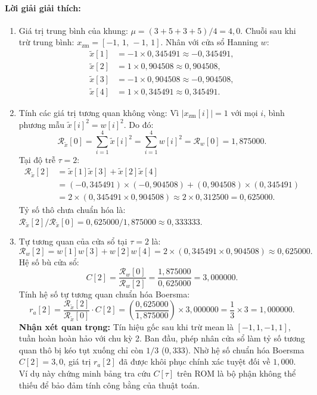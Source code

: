 \paragraph{Lời giải giải thích:}
\begin{enumerate}[label=\alph*)]
    \item Giá trị trung bình của khung: $\mu = (3 + 5 + 3 + 5) / 4 = 4{,}0$.
    Chuỗi sau khi trừ trung bình: $x_{\mathrm{zm}} = [-1,\, 1,\, -1,\, 1]$.
    Nhân với cửa sổ Hanning $w$:
    \begin{align*}
    \tilde{x}[1] &= -1 \times 0{,}345491 \approx -0{,}345491,\\[4pt]
    \tilde{x}[2] &= 1 \times 0{,}904508 \approx 0{,}904508,\\[4pt]
    \tilde{x}[3] &= -1 \times 0{,}904508 \approx -0{,}904508,\\[4pt]
    \tilde{x}[4] &= 1 \times 0{,}345491 \approx 0{,}345491.
    \end{align*}
    \item Tính các giá trị tương quan không vòng:
    Vì $|x_{\mathrm{zm}}[i]| = 1$ với mọi $i$, bình phương mẫu $\tilde{x}[i]^2 = w[i]^2$. Do đó:
    \[
    \mathcal{R}_{\tilde{x}}[0] = \sum_{i=1}^{4} \tilde{x}[i]^2 = \sum_{i=1}^{4} w[i]^2 = \mathcal{R}_w[0] = 1{,}875000.
    \]
    Tại độ trễ $\tau = 2$:
    \begin{align*}
    \mathcal{R}_{\tilde{x}}[2] &= \tilde{x}[1]\tilde{x}[3] + \tilde{x}[2]\tilde{x}[4]\\[4pt]
    &= (-0{,}345491) \times (-0{,}904508) + (0{,}904508) \times (0{,}345491)\\[4pt]
    &= 2 \times (0{,}345491 \times 0{,}904508) \approx 2 \times 0{,}312500 = 0{,}625000.
    \end{align*}
    Tỷ số thô chưa chuẩn hóa là: $\mathcal{R}_{\tilde{x}}[2] / \mathcal{R}_{\tilde{x}}[0] = 0{,}625000 / 1{,}875000 \approx 0{,}333333$.
    \item Tự tương quan của cửa sổ tại $\tau = 2$ là:
    \[
    \mathcal{R}_w[2] = w[1]w[3] + w[2]w[4] = 2 \times (0{,}345491 \times 0{,}904508) \approx 0{,}625000.
    \]
    Hệ số bù cửa sổ:
    \[
    C[2] = \frac{\mathcal{R}_w[0]}{\mathcal{R}_w[2]} = \frac{1{,}875000}{0{,}625000} = 3{,}000000.
    \]
    Tính hệ số tự tương quan chuẩn hóa Boersma:
    \[
    r_a[2] = \frac{\mathcal{R}_{\tilde{x}}[2]}{\mathcal{R}_{\tilde{x}}[0]} \cdot C[2] = \left(\frac{0{,}625000}{1{,}875000}\right) \times 3{,}000000 = \frac{1}{3} \times 3 = 1{,}000000.
    \]
    \textbf{Nhận xét quan trọng:} Tín hiệu gốc sau khi trừ mean là $[-1, 1, -1, 1]$, tuần hoàn hoàn hảo với chu kỳ 2. Ban đầu, phép nhân cửa sổ làm tỷ số tương quan thô bị kéo tụt xuống chỉ còn $1/3$ ($0{,}333$). Nhờ hệ số chuẩn hóa Boersma $C[2] = 3{,}0$, giá trị $r_a[2]$ đã được khôi phục chính xác tuyệt đối về $1{,}000$. Ví dụ này chứng minh bảng tra cứu $C[\tau]$ trên ROM là bộ phận không thể thiếu để bảo đảm tính công bằng của thuật toán.
\end{enumerate}

